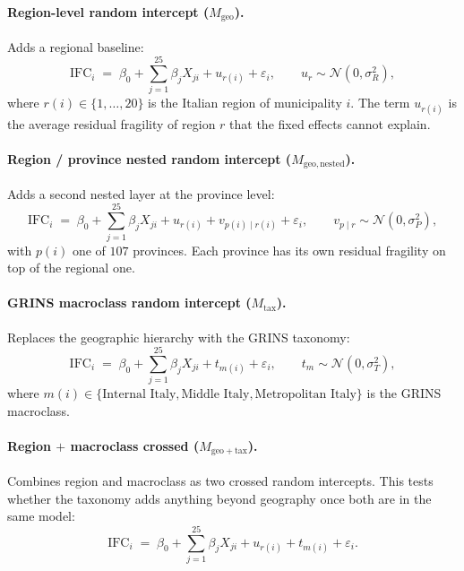 \documentclass[11pt,a4paper]{article}
\begin{document}
\paragraph{Region-level random intercept ($M_{\mathrm{geo}}$).}
Adds a regional baseline:
\begin{equation}
  \mathrm{IFC}_i \;=\; \beta_0 + \sum_{j=1}^{25} \beta_j X_{ji}
                       + u_{r(i)} + \varepsilon_i,
  \qquad u_r \sim \mathcal{N}(0,\sigma_R^2),
  \label{eq:geo}
\end{equation}
where $r(i) \in \{1,\dots,20\}$ is the Italian region of municipality
$i$. The term $u_{r(i)}$ is the average residual fragility of region
$r$ that the fixed effects cannot explain.

\paragraph{Region / province nested random intercept ($M_{\mathrm{geo,nested}}$).}
Adds a second nested layer at the province level:
\begin{equation}
  \mathrm{IFC}_i \;=\; \beta_0 + \sum_{j=1}^{25} \beta_j X_{ji}
                       + u_{r(i)} + v_{p(i)\mid r(i)} + \varepsilon_i,
  \qquad v_{p\mid r} \sim \mathcal{N}(0,\sigma_P^2),
  \label{eq:geo_nested}
\end{equation}
with $p(i)$ one of $107$ provinces. Each province has its own
residual fragility on top of the regional one.

\paragraph{GRINS macroclass random intercept ($M_{\mathrm{tax}}$).}
Replaces the geographic hierarchy with the GRINS taxonomy:
\begin{equation}
  \mathrm{IFC}_i \;=\; \beta_0 + \sum_{j=1}^{25} \beta_j X_{ji}
                       + t_{m(i)} + \varepsilon_i,
  \qquad t_m \sim \mathcal{N}(0,\sigma_T^2),
  \label{eq:tax}
\end{equation}
where $m(i) \in \{\text{Internal Italy},\text{Middle Italy},
\text{Metropolitan Italy}\}$ is the GRINS macroclass.

\paragraph{Region $+$ macroclass crossed ($M_{\mathrm{geo+tax}}$).}
Combines region and macroclass as two crossed random intercepts.
This tests whether the taxonomy adds anything beyond geography once
both are in the same model:
\begin{equation}
  \mathrm{IFC}_i \;=\; \beta_0 + \sum_{j=1}^{25} \beta_j X_{ji}
                       + u_{r(i)} + t_{m(i)} + \varepsilon_i.
  \label{eq:geo_plus_tax}
\end{equation}
\end{document}

